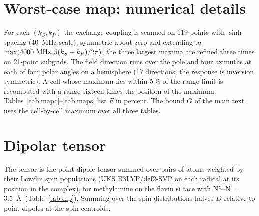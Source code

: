 \documentclass[11pt]{article}
\begin{document}
\section{Worst-case map: numerical details}
For each $(k_S,k_P)$ the exchange coupling is scanned on 119 points with
$\sinh$ spacing (40~MHz scale), symmetric about zero and extending to
$\max(4000~{\rm MHz},5(k_S+k_P)/2\pi)$; the three largest maxima are refined
three times on 21-point subgrids. The field direction runs over the pole and
four azimuths at each of four polar angles on a hemisphere (17 directions; the
response is inversion symmetric). A cell whose maximum lies within 5\,\% of the
range limit is recomputed with a range sixteen times the position of the
maximum. Tables~\ref{tab:mapc}--\ref{tab:maps} list $F$ in percent. The bound $G$ of the main text uses the cell-by-cell maximum over all three tables.

\begin{table}[h]
\caption{$F(k_S,k_P)$ (\%) with the contact dipolar tensor. Rates in
$\mu$s$^{-1}$.}
\label{tab:mapc}
\centering
\resizebox{\textwidth}{!}{}
\end{table}

\begin{table}[h]
\caption{$F(k_S,k_P)$ (\%) without dipolar coupling.}
\label{tab:mapn}
\centering
\resizebox{\textwidth}{!}{}
\end{table}

\begin{table}[h]
\caption{$F(k_S,k_P)$ (\%) with the contact dipolar tensor scaled by the factor
shown, on the onward rates that set the thresholds of $G$.}
\label{tab:maps}
\centering
\resizebox{\textwidth}{!}{}
\end{table}

\section{Dipolar tensor}
The tensor is the point-dipole tensor summed over pairs of atoms weighted by
their Löwdin spin populations (UKS B3LYP/def2-SVP on each radical at its position
in the complex), for methylamine on the flavin si face with N5--N = 3.5~\AA\
(Table~\ref{tab:dip}). Summing over the spin distributions halves $D$ relative
to point dipoles at the spin centroids.

\begin{table}[h]
\caption{Dipolar coupling of the contact pair.}
\label{tab:dip}
\centering

\end{table}
\end{document}
